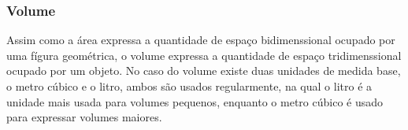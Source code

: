 \begin{multicols*}{2}
    \begin{table}[H]
    \end{table}

    \subsubsection{Volume}
    Assim como a área expressa a quantidade de espaço bidimenssional ocupado por uma fígura geométrica, o volume expressa
    a quantidade de espaço tridimenssional ocupado por um objeto. No caso do volume existe duas unidades de medida base,
    o metro cúbico e o litro, ambos são usados regularmente, na qual o litro é a unidade mais usada para volumes
    pequenos, enquanto o metro cúbico é usado para expressar volumes maiores.


\end{multicols*}
